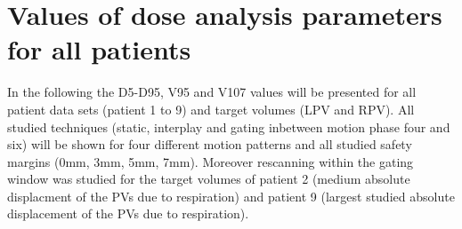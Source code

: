 \documentclass[type=dr, dr=rernat, accentcolor=tud7b,colorbacktitle, bigchapter, openright, twoside, 12pt ]{tudthesis}
\begin{document}
\section{Values of dose analysis parameters for all patients}
 In the following the D5-D95, V95 and V107 values will be presented for all patient data sets (patient 1 to 9) and target volumes (LPV 
 and RPV). All studied techniques (static, interplay and gating inbetween motion phase four and six) will be shown for 
 four different motion patterns and all studied safety margins (0mm, 3mm, 5mm, 7mm). Moreover rescanning within the gating window was studied 
 for the target volumes of patient 2 (medium absolute displacment of the PVs due to respiration) and patient 9 
 (largest studied absolute displacement of the PVs due to respiration). 

\newpage
\end{document}
